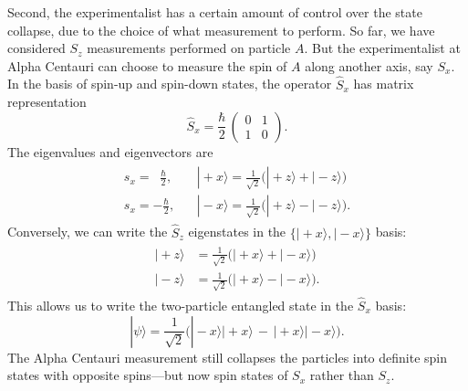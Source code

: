 \documentclass[pra,12pt]{revtex4}
\begin{document}
Second, the experimentalist has a certain amount of control over the
state collapse, due to the choice of what measurement to perform.  So
far, we have considered $S_z$ measurements performed on particle $A$.
But the experimentalist at Alpha Centauri can choose to measure the
spin of $A$ along another axis, say $S_x$.  In the basis of spin-up
and spin-down states, the operator $\hat{S}_x$ has matrix
representation
\begin{equation}
  \hat{S}_x = \frac{\hbar}{2}\, \begin{pmatrix}0&1\\1&0\end{pmatrix}.
  \end{equation}
The eigenvalues and eigenvectors are
\begin{align}
  \begin{aligned}s_x = \;\;\frac{\hbar}{2},\; &\;\;\; |\!+\!x\rangle = \frac{1}{\sqrt{2}}\Big(|\!+\!z\rangle + |\!-\!z\rangle\Big) \\ s_x = -\frac{\hbar}{2}, &\;\;\; |\!-\!x\rangle = \frac{1}{\sqrt{2}}\Big(|\!+\!z\rangle - |\!-\!z\rangle\Big).\end{aligned}
\end{align}
Conversely, we can write the $\hat{S}_z$ eigenstates in the $\{|\!+\!x\rangle,|\!-\!x\rangle\}$ basis:
\begin{align}
  \begin{aligned}|\!+\!z\rangle &= \frac{1}{\sqrt{2}}\Big(|\!+\!x\rangle + |\!-\!x\rangle\Big) \\ |\!-\!z\rangle &= \frac{1}{\sqrt{2}}\Big(|\!+\!x\rangle - |\!-\!x\rangle\Big).\end{aligned}
\end{align}
This allows us to write the two-particle entangled state in the
$\hat{S}_x$ basis:
\begin{equation}
  |\psi\rangle = \frac{1}{\sqrt{2}} \Big(|\!-\!x\rangle|\!+\!x\rangle \,-\, |\!+\!x\rangle|\!-\!x\rangle\Big).
\end{equation}
The Alpha Centauri measurement still collapses the particles into
definite spin states with opposite spins---but now spin states of
${S}_x$ rather than ${S}_z$.
\end{document}
